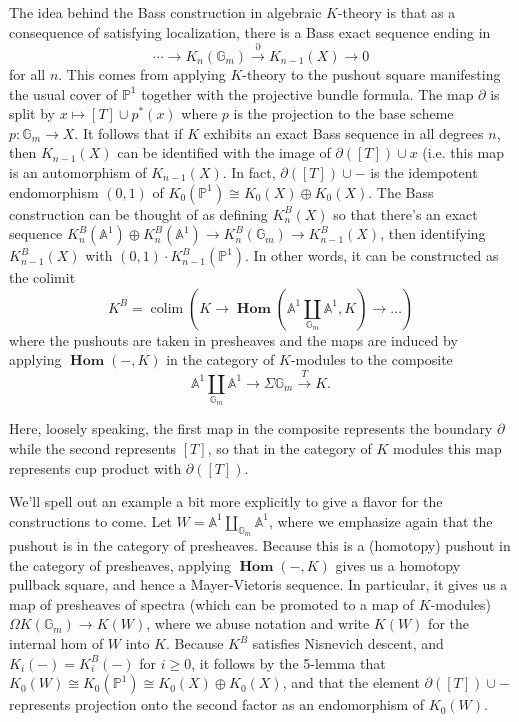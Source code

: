 \documentclass[draftthesis,tocnosub,noragright,centerchapter,10pt]{uiucthesis2009}
\newcommand{\mbb}{\mathbb}
\DeclareMathOperator*{\colim}{colim}
\DeclareMathOperator{\iHom}{\mathbf{Hom}}
\theoremstyle{plain}
\theoremstyle{definition}
\begin{document}
The idea behind the Bass construction in algebraic $K$-theory is that
as a consequence of satisfying localization, there is a
Bass exact sequence ending in
\[
\cdots \rightarrow K_n(\mbb G_m) \xrightarrow{\partial} K_{n-1}(X) \rightarrow 0
\]
for all $n$. This comes from applying $K$-theory to the pushout square manifesting
the usual cover of $\mbb P^1$ together with the projective bundle formula. The map $\partial$ is split by $x
\mapsto [T] \cup p^*(x)$ where $p$ is the projection to the base scheme $p : \mbb G_m
\rightarrow X$. It follows that if $K$ exhibits an exact Bass sequence
in all degrees $n$, then $K_{n-1}(X)$ can be identified with
the image of $\partial([T]) \cup x$ (i.e. this map is an automorphism
of $K_{n-1}(X)$. In fact, $\partial([T]) \cup -$ is the idempotent endomorphism
$(0,1)$ of $K_{0}(\mbb P^1) \cong K_0(X) \oplus K_0(X)$.
 The Bass construction can be thought of as defining
$K^B_n(X)$ so that there's an exact sequence $K^B_n(\mbb A^1) \oplus
K^B_n(\mbb A^1) \rightarrow K^B_n(\mbb G_m) \rightarrow K^B_{n-1}(X)$,
then identifying $K^B_{n-1}(X)$ with $(0,1) \cdot
K^B_{n-1}(\mbb P^1)$. In other words, it can be constructed as the colimit
\[
K^B = \colim(K \rightarrow \iHom(\mbb A^1 \coprod_{\mbb G_m} \mbb
A^1,K) \rightarrow \dots)
\] 
where the pushouts are taken in presheaves and the maps are induced by applying $\iHom(-,K)$ in the category of
$K$-modules to the composite
\[
\mbb A^1 \coprod_{\mbb G_m} \mbb A^1 \rightarrow \Sigma \mbb G_m
\xrightarrow{T} K.
\]

Here, loosely speaking, the first map in the composite represents the boundary $\partial$
while the second represents $[T]$, so that in the category of $K$
modules this map represents cup product with $\partial([T])$. 

We'll spell out an example a bit more explicitly to give a flavor for the
constructions to come. Let $W = \mbb A^1 \coprod_{\mbb G_m} \mbb A^1$,
where we emphasize again that the pushout is in the category of
presheaves. Because this is a (homotopy) pushout in the category of
presheaves, applying $\iHom(-,K)$ gives us a homotopy pullback square,
and hence a Mayer-Vietoris sequence. In particular, it gives us a map
of presheaves of spectra (which can be promoted to a map of $K$-modules) $\Omega  K(\mbb G_m) \rightarrow K(W)$, where
we abuse notation and write $K(W)$ for the internal hom of $W$ into
$K$. Because $K^B$ satisfies Nisnevich descent, and $K_i(-) =
K^B_i(-)$ for $i \geq 0$, it follows by the 5-lemma that $K_0(W) \cong
K_0(\mbb P^1) \cong K_0(X) \oplus K_0(X)$, and that the element
$\partial([T]) \cup -$ represents projection onto the second factor as an
endomorphism of $K_0(W)$. 
\end{document}
